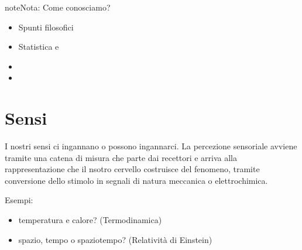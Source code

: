 \documentclass[letterpaper,10pt,italian]{jupyterBook}
\begin{document}
\begin{sphinxadmonition}{note}{Nota:}
\sphinxAtStartPar
Come conosciamo?
\begin{itemize}
\item {} 
\sphinxAtStartPar
Spunti filosofici

\item {} 
\sphinxAtStartPar
Statistica e 

\end{itemize}
\end{sphinxadmonition}

\sphinxAtStartPar
{}
\begin{itemize}
\item {} 
\sphinxAtStartPar
{}

\item {} 
\sphinxAtStartPar
{}

\end{itemize}

\sphinxstepscope


\chapter{Sensi}
\label{\detokenize{ch/intro/sensing:sensi}}\label{\detokenize{ch/intro/sensing:physics-hs-intro-sensing}}\label{\detokenize{ch/intro/sensing::doc}}
\sphinxAtStartPar
I nostri sensi ci ingannano o possono ingannarci. La percezione sensoriale avviene tramite una catena di misura che parte dai recettori e arriva alla rappresentazione che il nsotro cervello costruisce del fenomeno, tramite conversione dello stimolo in segnali di natura meccanica o elettro\sphinxhyphen{}chimica.

\sphinxAtStartPar
Esempi:
\begin{itemize}
\item {} 
\sphinxAtStartPar
temperatura e calore? (Termodinamica)

\item {} 
\sphinxAtStartPar
spazio, tempo o spazio\sphinxhyphen{}tempo? (Relatività di Einstein)

\end{itemize}

\sphinxAtStartPar
{} 
\end{document}
